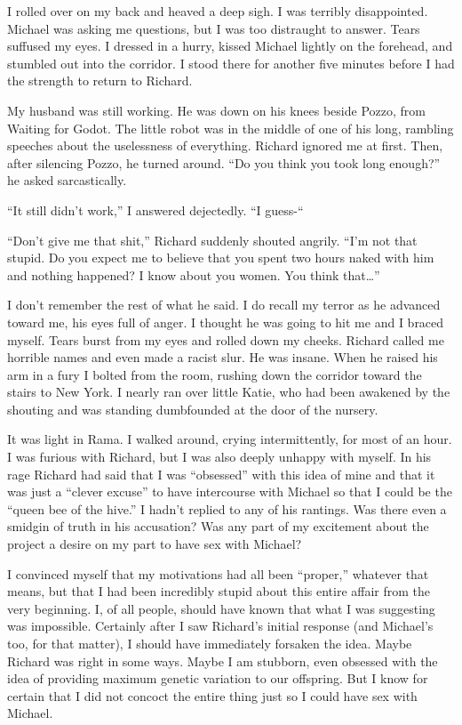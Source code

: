 \documentclass[]{article}
\begin{document}
I rolled over on my back and heaved a deep sigh. I was terribly disappointed. Michael was asking me questions, but I was too distraught to answer. Tears suffused my eyes. I dressed in a hurry, kissed Michael lightly on the forehead, and stumbled out into the corridor. I stood there for another five minutes before I had the strength to return to Richard.

My husband was still working. He was down on his knees beside Pozzo, from Waiting for Godot. The little robot was in the middle of one of his long, rambling speeches about the uselessness of everything. Richard ignored me at first. Then, after silencing Pozzo, he turned around. “Do you think you took long enough?” he asked sarcastically.

“It still didn’t work,” I answered dejectedly. “I guess-“

“Don’t give me that shit,” Richard suddenly shouted angrily. “I’m not that stupid. Do you expect me to believe that you spent two hours naked with him and nothing happened? I know about you women. You think that…”

I don’t remember the rest of what he said. I do recall my terror as he advanced toward me, his eyes full of anger. I thought he was going to hit me and I braced myself. Tears burst from my eyes and rolled down my cheeks. Richard called me horrible names and even made a racist slur. He was insane. When he raised his arm in a fury I bolted from the room, rushing down the corridor toward the stairs to New York. I nearly ran over little Katie, who had been awakened by the shouting and was standing dumbfounded at the door of the nursery.

It was light in Rama. I walked around, crying intermittently, for most of an hour. I was furious with Richard, but I was also deeply unhappy with myself. In his rage Richard had said that I was “obsessed” with this idea of mine and that it was just a “clever excuse” to have intercourse with Michael so that I could be the “queen bee of the hive.” I hadn’t replied to any of his rantings. Was there even a smidgin of truth in his accusation? Was any part of my excitement about the project a desire on my part to have sex with Michael?

I convinced myself that my motivations had all been “proper,” whatever that means, but that I had been incredibly stupid about this entire affair from the very beginning. I, of all people, should have known that what I was suggesting was impossible. Certainly after I saw Richard’s initial response (and Michael’s too, for that matter), I should have immediately forsaken the idea. Maybe Richard was right in some ways. Maybe I am stubborn, even obsessed with the idea of providing maximum genetic variation to our offspring. But I know for certain that I did not concoct the entire thing just so I could have sex with Michael.
\end{document}
